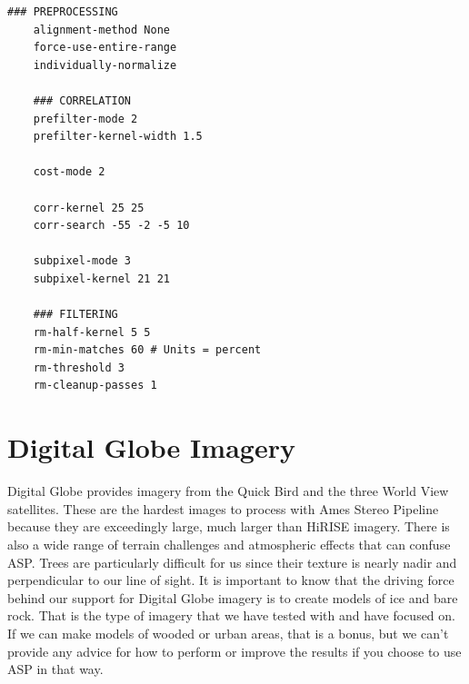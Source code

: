 \begin{center}\begin{minipage}{5.5in}
\begin{Verbatim}[frame=single,fontsize=\small,label=stereo.default for Cassini ISS]
    ### PREPROCESSING
    alignment-method None
    force-use-entire-range
    individually-normalize

    ### CORRELATION
    prefilter-mode 2
    prefilter-kernel-width 1.5

    cost-mode 2

    corr-kernel 25 25
    corr-search -55 -2 -5 10

    subpixel-mode 3
    subpixel-kernel 21 21

    ### FILTERING
    rm-half-kernel 5 5
    rm-min-matches 60 # Units = percent
    rm-threshold 3
    rm-cleanup-passes 1

\end{Verbatim}
\end{minipage}\end{center}

\newpage
\section{Digital Globe Imagery}
\label{sec:digital_globe_imagery}

Digital Globe provides imagery from the Quick Bird and the three World
View satellites. These are the hardest images to process with Ames
Stereo Pipeline because they are exceedingly large, much larger than
HiRISE imagery. There is also a wide range of terrain challenges and
atmospheric effects that can confuse ASP. Trees are particularly
difficult for us since their texture is nearly nadir and perpendicular
to our line of sight. It is important to know that the driving force
behind our support for Digital Globe imagery is to create models of
ice and bare rock. That is the type of imagery that we have tested
with and have focused on. If we can make models of wooded or urban
areas, that is a bonus, but we can't provide any advice for how to
perform or improve the results if you choose to use ASP in that way.

